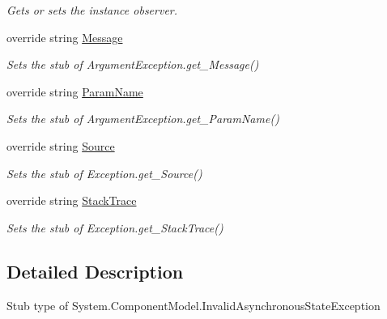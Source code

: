 \begin{DoxyCompactItemize}
\begin{DoxyCompactList}\small\item\em Gets or sets the instance observer.\end{DoxyCompactList}\item 
override string \hyperlink{class_system_1_1_component_model_1_1_fakes_1_1_stub_invalid_asynchronous_state_exception_ad1342e3e9abec609f1f6a136280a9e14}{Message}
\begin{DoxyCompactList}\small\item\em Sets the stub of Argument\-Exception.\-get\-\_\-\-Message()\end{DoxyCompactList}\item 
override string \hyperlink{class_system_1_1_component_model_1_1_fakes_1_1_stub_invalid_asynchronous_state_exception_ab639e2fef821836b30caff05f6323c00}{Param\-Name}
\begin{DoxyCompactList}\small\item\em Sets the stub of Argument\-Exception.\-get\-\_\-\-Param\-Name()\end{DoxyCompactList}\item 
override string \hyperlink{class_system_1_1_component_model_1_1_fakes_1_1_stub_invalid_asynchronous_state_exception_a4b4fd26d65318219d558eb14a0ca1519}{Source}
\begin{DoxyCompactList}\small\item\em Sets the stub of Exception.\-get\-\_\-\-Source()\end{DoxyCompactList}\item 
override string \hyperlink{class_system_1_1_component_model_1_1_fakes_1_1_stub_invalid_asynchronous_state_exception_a4150ab3d10c97b74e757f5d65cb48350}{Stack\-Trace}
\begin{DoxyCompactList}\small\item\em Sets the stub of Exception.\-get\-\_\-\-Stack\-Trace()\end{DoxyCompactList}\end{DoxyCompactItemize}


\subsection{Detailed Description}
Stub type of System.\-Component\-Model.\-Invalid\-Asynchronous\-State\-Exception



